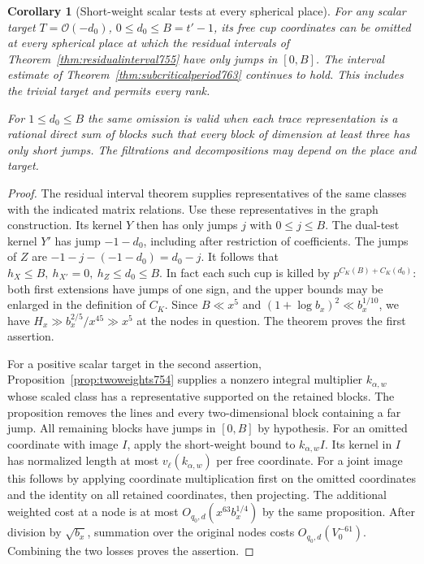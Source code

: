 \documentclass[a4paper,11pt]{article}
\newtheorem{corollary}[proposition]{Corollary}
\theoremstyle{definition}
\theoremstyle{remark}
\numberwithin{equation}{section}
\begin{document}
\begin{corollary}[Short-weight scalar tests at every spherical place]
\leavevmode\label{cor:shortscalar763}
For any scalar target \(T=\mathcal O(-d_0)\),
\(0\le d_0\le B=t'-1\), its free cup coordinates can be
omitted at every spherical place at which the residual
intervals of Theorem~\ref{thm:residualinterval755} have
only jumps in \([0,B]\). The interval estimate of
Theorem~\ref{thm:subcriticalperiod763} continues to hold.
This includes the trivial target and permits every rank.

For \(1\le d_0\le B\) the same omission is valid when
each trace representation is a rational direct sum of
blocks such that every block of dimension at least three
has only short jumps. The filtrations and decompositions
may depend on the place and target.
\end{corollary}
\begin{proof}
The residual interval theorem supplies representatives of
the same classes with the indicated matrix relations. Use
these representatives in the graph construction. Its kernel
\(Y\) then has only jumps \(j\) with \(0\le j\le B\).
The dual-test kernel \(Y'\) has jump \(-1-d_0\), including
after restriction of coefficients. The jumps of \(Z\) are
\(-1-j-(-1-d_0)=d_0-j\). It follows that
\(h_X\le B,\ h_{X'}=0,\ h_Z\le d_0\le B\).
In fact each such cup is killed by
\(p^{C_K(B)+C_K(d_0)}\): both first extensions have jumps
of one sign, and the upper bounds may be enlarged in the
definition of \(C_K\). Since \(B\ll x^5\) and
\((1+\log b_x)^2\ll b_x^{1/10}\), we have
\(H_x\gg b_x^{2/5}/x^{45}\gg x^5\) at the nodes in question.
The theorem proves the first assertion.

For a positive scalar target in the second assertion,
Proposition~\ref{prop:twoweights754} supplies a nonzero
integral multiplier \(k_{\alpha,w}\) whose scaled class
has a representative supported on the retained blocks.
The proposition removes the lines and every two-dimensional
block containing a far jump. All remaining blocks have
jumps in \([0,B]\) by hypothesis. For an omitted coordinate
with image \(I\), apply the short-weight bound to
\(k_{\alpha,w} I\). Its kernel in \(I\) has normalized
length at most \(v_\ell(k_{\alpha,w})\) per free coordinate.
For a joint image this follows by applying coordinate
multiplication first on the omitted coordinates and the
identity on all retained coordinates, then projecting.
The additional weighted cost at a node is at most
\(O_{q_0,d}(x^{63}b_x^{1/4})\) by the same proposition.
After division by \(\sqrt{b_x}\), summation over the
original nodes costs \(O_{q_0,d}(V_0^{-61})\).
Combining the two losses proves the assertion.
\end{proof}
\end{document}
